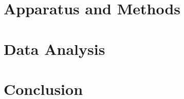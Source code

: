\documentclass[%
 aip,
 amsmath,amssymb,
 reprint,%
floatfix,
]{revtex4-1}
\begin{document}
\section{\label{sec:level3}Apparatus and Methods}


\section{\label{sec:level4}Data Analysis}


\section{\label{sec:level5}Conclusion}


\nocite{*}
\end{document}
